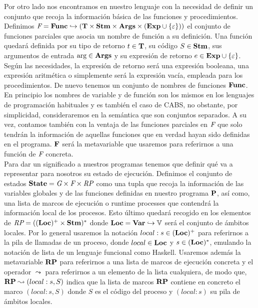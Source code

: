 Por otro lado nos encontramos en nuestro lenguaje con la necesidad de definir un conjunto que recoja la información básica de las funciones y procedimientos. Definimos $\Fs = \Func \hookrightarrow (\T \times \Stm \times \Args \times (\Exp \cup \{\varepsilon\}))$ el conjunto de funciones parciales que asocia un nombre de función a su definición. Una función quedará definida por su tipo de retorno $t \in \T$, su código $S \in \Stm$, sus argumentos de entrada $\args \in \Args$ y su expresión de retorno $e \in \Exp \cup \{\varepsilon\}$. Según las necesidades, la expresión de retorno será una expresión booleana, una expresión aritmética o simplemente será la expresión vacía, empleada para los procedimientos. De nuevo tenemos un conjunto de nombres de funciones $\Func$. En principio los nombres de variable y de función son los mismos en los lenguajes de programación habituales y es también el caso de CABS, no obstante, por simplicidad, consideraremos en la semántica que son conjuntos separados. A su vez, contamos también con la ventaja de las funciones parciales en $\Fs$ que solo tendrán la información de aquellas funciones que en verdad hayan sido definidas en el programa. $\F$ será la metavariable que usaremos para referirnos a una función de $\Fs$ concreta.\\

Para dar un significado a nuestros programas tenemos que definir qué va a representar para nosotros su estado de ejecución. Definimos el conjunto de estados $\State = \Gs \times \Fs \times \RPs$ como una tupla que recoja la información de las variables globales y de las funciones definidas en nuestro programa $\P$, así como, una lista de marcos de ejecución o runtime processes que contendrá la información local de los procesos. Esto último quedará recogido en los elementos de $\RPs = ((\loc)^+ \times \Stm)^*$ donde $\loc = \Var \hookrightarrow \V$ será el conjunto de ámbitos locales. Por lo general usaremos la notación $local:s \in (\loc)^+$ para referirnos a la pila de llamadas de un proceso, donde $local \in \loc$ y $s \in (\loc)^*$, emulando la notación de lista de un lenguaje funcional como Haskell. Usaremos además la metavariable $\RP$ para referirnos a una lista de marcos de ejecución concreta y el operador $\leadsto$ para referirnos a un elemento de la lista cualquiera, de modo que, $\RP \leadsto (local:s, S)$ indica que la lista de marcos $\RP$ contiene en concreto el marco $(local:s, S)$ donde $S$ es el código del proceso y $(local:s)$ su pila de ámbitos locales.\\

